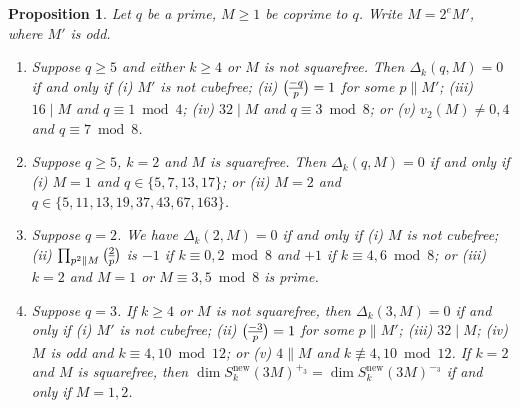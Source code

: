 \documentclass[11pt]{amsart}
\newcommand{\new}{\mathrm{new}}
\renewcommand{\mod}{\bmod}
\newcommand{\leg}{\overwithdelims ()}
\numberwithin{lem}{section}
\newtheorem{prop}[lem]{Proposition}
\theoremstyle{remark}
\theoremstyle{definition}
\numberwithin{equation}{section}
\begin{document}
\begin{prop} \label{prop:req1}
Let $q$ be a prime, $M \ge 1$ be coprime to $q$.  Write $M=2^e M'$, where $M'$ is odd.

\begin{enumerate}
\item Suppose $q \ge 5$ and either $k \ge 4$ or $M$ is not squarefree.  Then
$\Delta_k(q,M) = 0$ if and only if 
(i) $M'$ is not cubefree; (ii) ${-q \leg p} = 1$ for some $p \parallel M'$; 
(iii) $16 \mid M$ and $q \equiv 1 \mod 4$; (iv) $32 \mid M$ and $q \equiv 3 \mod 8$;
or (v) $v_2(M) \ne 0, 4$ and $q \equiv 7 \mod 8$.

\item Suppose $q \ge 5$, $k=2$ and $M$ is squarefree.
Then $\Delta_k(q,M) = 0$ if and only if (i) $M = 1$ and
$q \in \{ 5, 7, 13, 17 \}$; or (ii) $M = 2$ and $q \in \{ 5, 11, 13, 19, 37, 43, 67, 163 \}$.

\item Suppose $q=2$.  We have $\Delta_k(2,M) = 0$ if and only if 
(i) $M$ is not cubefree; (ii) $\prod_{p^2 \parallel M} {2 \leg p}$ is $-1$
if $k \equiv 0, 2 \mod 8$ and $+1$ if $k \equiv 4, 6 \mod 8$; or
(iii) $k=2$ and $M = 1$ or $M \equiv 3, 5 \mod 8$ is prime.

\item Suppose $q=3$.  If $k \ge 4$ or $M$ is not squarefree, then  $\Delta_k(3,M) = 0$ if and only if (i) $M'$ is not cubefree; (ii) ${-3 \leg p} = 1$ for some $p \parallel M'$; (iii) $32 \mid M$; (iv) $M$ is odd and $k \equiv 4, 10 \mod 12$; or (v) $4 \parallel M$ and $k \not \equiv 4, 10 \mod 12$.
 If $k=2$ and $M$ is squarefree, then $\dim S_k^\new(3M)^{+_3} = \dim S_k^\new(3M)^{-_3}$ if and only if $M = 1, 2$. 
\end{enumerate}
\end{prop}
\end{document}
